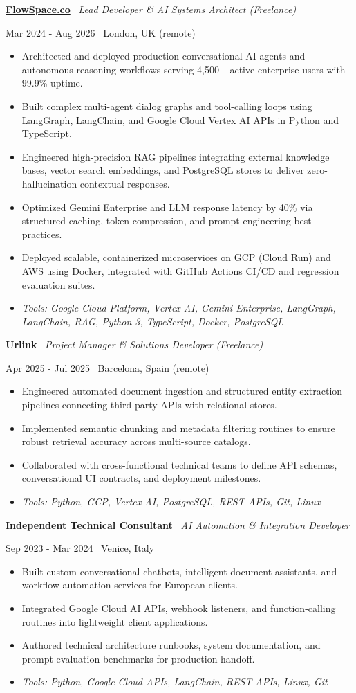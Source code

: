 \documentclass[a4paper,10pt]{article}
\newcommand{\role}[4]{%
  \vspace{2pt}\noindent
  \begin{minipage}[t]{0.70\textwidth}\raggedright\textbf{#1} \textbullet\ \textit{#3}\end{minipage}%
  \hfill
  \begin{minipage}[t]{0.28\textwidth}\raggedleft\footnotesize\color{gray}#2 \textbullet\ #4\end{minipage}%
  \vspace{1pt}%
}
\begin{document}
\role{\href{https://flowspace.co}{FlowSpace.co}}{Mar 2024 - Aug 2026}{Lead Developer \& AI Systems Architect (Freelance)}{London, UK (remote)}
\begin{itemize}
  \item Architected and deployed production conversational AI agents and autonomous reasoning workflows serving 4,500+ active enterprise users with 99.9\% uptime.
  \item Built complex multi-agent dialog graphs and tool-calling loops using LangGraph, LangChain, and Google Cloud Vertex AI APIs in Python and TypeScript.
  \item Engineered high-precision RAG pipelines integrating external knowledge bases, vector search embeddings, and PostgreSQL stores to deliver zero-hallucination contextual responses.
  \item Optimized Gemini Enterprise and LLM response latency by 40\% via structured caching, token compression, and prompt engineering best practices.
  \item Deployed scalable, containerized microservices on GCP (Cloud Run) and AWS using Docker, integrated with GitHub Actions CI/CD and regression evaluation suites.
  \item \textit{Tools: Google Cloud Platform, Vertex AI, Gemini Enterprise, LangGraph, LangChain, RAG, Python 3, TypeScript, Docker, PostgreSQL}
\end{itemize}

\role{Urlink}{Apr 2025 - Jul 2025}{Project Manager \& Solutions Developer (Freelance)}{Barcelona, Spain (remote)}
\begin{itemize}
  \item Engineered automated document ingestion and structured entity extraction pipelines connecting third-party APIs with relational stores.
  \item Implemented semantic chunking and metadata filtering routines to ensure robust retrieval accuracy across multi-source catalogs.
  \item Collaborated with cross-functional technical teams to define API schemas, conversational UI contracts, and deployment milestones.
  \item \textit{Tools: Python, GCP, Vertex AI, PostgreSQL, REST APIs, Git, Linux}
\end{itemize}

\role{Independent Technical Consultant}{Sep 2023 - Mar 2024}{AI Automation \& Integration Developer}{Venice, Italy}
\begin{itemize}
  \item Built custom conversational chatbots, intelligent document assistants, and workflow automation services for European clients.
  \item Integrated Google Cloud AI APIs, webhook listeners, and function-calling routines into lightweight client applications.
  \item Authored technical architecture runbooks, system documentation, and prompt evaluation benchmarks for production handoff.
  \item \textit{Tools: Python, Google Cloud APIs, LangChain, REST APIs, Linux, Git}
\end{itemize}
\end{document}
